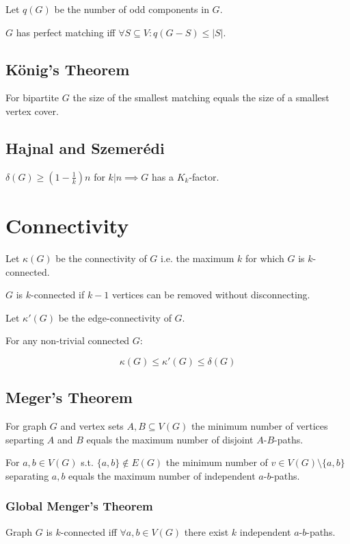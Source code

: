 Let $q(G)$ be the number of odd components in $G$.

$G$ has perfect matching iff $\forall S \subseteq V : q(G-S) \leq |S|$.

\subsection*{König's Theorem}

For bipartite $G$ the size of the smallest matching equals the size of a smallest vertex cover.

\subsection*{Hajnal and Szemer\'{e}di}

$\delta(G) \geq (1-\frac{1}{k})n$ for $k | n \implies G$ has a $K_k$-factor.

\section*{Connectivity}

Let $\kappa(G)$ be the connectivity of $G$ i.e. the maximum $k$ for which $G$ is $k$-connected.

$G$ is $k$-connected if $k-1$ vertices can be removed without disconnecting.

Let $\kappa'(G)$ be the edge-connectivity of $G$.

For any non-trivial connected $G$:

$$\kappa(G) \leq \kappa'(G) \leq \delta(G)$$

\subsection*{Meger's Theorem}

For graph $G$ and vertex sets $A,B \subseteq V(G)$ the minimum number of vertices separting $A$ and $B$ equals the maximum number of disjoint $A$-$B$-paths.

\spacing

For $a, b \in V(G)$ s.t. $\{a,b\} \notin E(G)$ the minimum number of $v \in V(G)\setminus\{a,b\}$ separating $a, b$ equals the maximum number of independent $a$-$b$-paths.

\subsubsection*{Global Menger's Theorem}

Graph $G$ is $k$-connected iff $\forall a,b \in V(G)$ there exist $k$ independent $a$-$b$-paths.

